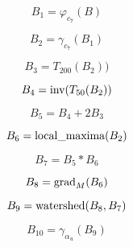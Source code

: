 \documentclass[\main/main.tex]{subfiles}
\begin{document}
\begin{equation}
    \label{eq:larva:closing_1}
    B_1= \varphi_{c_7}(B)
\end{equation}

\begin{equation}
    \label{eq:larva:open_1}
    B_2= \gamma_{c_7}(B_1)
\end{equation}

\begin{equation}
    \label{eq:larva:thresh:high}
    B_3= T_{200}(B_2))
\end{equation}

\begin{equation}
    \label{eq:larva:thresh:low}
    B_4= \operatorname{\textnormal{inv}}(T_{50}(B_2))
\end{equation}

\begin{equation}
    \label{eq:larva:zones}
    B_5= B_4 + 2B_3
\end{equation}

\begin{equation}
    \label{eq:larva:max_loc}
    B_6 = \operatorname{\textnormal{local\_maxima}}(B_2)
\end{equation}

\begin{equation}
    \label{eq:larva:seeds}
    B_7= B_5 * B_6
\end{equation}

\begin{equation}
    \label{eq:larva:grad}
    B_8= \operatorname{\textnormal{grad}}_M(B_6)
\end{equation}

\begin{equation}
    \label{eq:larva:water}
    B_9= \operatorname{\textnormal{watershed}}(B_8,B_7)
\end{equation}

\begin{equation}
    \label{eq:larva:open_volume}
    B_{10}= \gamma_{\alpha}_{u}(B_9)
\end{equation}
\end{document}
